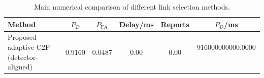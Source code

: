 \begin{table}[t]
    \centering
    \caption{Main numerical comparison of different link selection methods.}
    \label{tab:main_summary}
    \begin{tabular}{l c c c c c}
        \hline
        Method & $P_D$ & $P_{\mathrm{FA}}$ & Delay/ms & Reports & $P_D$/ms \\
        \hline
        Proposed adaptive C2F (detector-aligned) & 0.9160 & 0.0487 & 0.00 & 0.00 & 916000000000.0000 \
        \hline
    \end{tabular}
\end{table}

